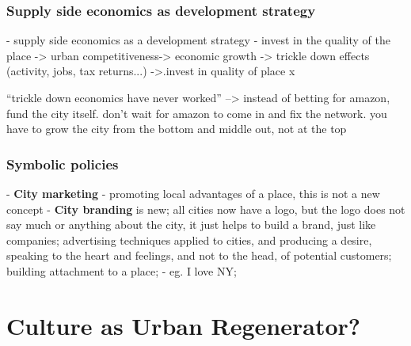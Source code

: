 \documentclass{article}
\begin{document}
\subsubsection{Supply side economics as development  strategy}

	- supply side economics as a development strategy
		- invest in the quality of the place -> urban competitiveness-> economic growth -> trickle down effects (activity, jobs, tax returns...) ->.invest in quality of place x

``trickle down economics have never worked'' --> instead of betting for amazon, fund the city itself. don't wait for amazon to come in and fix the network. you have to grow the city from the bottom and middle out, not at the top

\subsubsection{Symbolic policies}

- \textbf{City marketing} - promoting local advantages of a place, this is not a new concept
- \textbf{City branding} is new; all cities now have a logo, but the logo does not say much or anything about the city, it just helps to build a brand, just like companies; advertising techniques applied to cities, and producing a desire, speaking to the heart and feelings, and not to the head, of potential customers; building attachment to a place;
	- eg. I love NY; 



\section{Culture as Urban Regenerator?}

\subsection{}

\begin{outline}
	\1
\end{outline}

\subsection{}

\subsection{}
\end{document}
